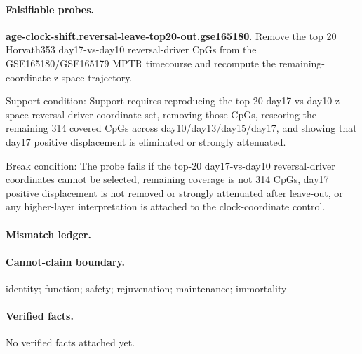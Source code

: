 \paragraph{Falsifiable probes.}
\textbf{age-clock-shift.reversal-leave-top20-out.gse165180}. Remove the top 20 Horvath353 day17-vs-day10 reversal-driver CpGs from the GSE165180/GSE165179 MPTR timecourse and recompute the remaining-coordinate z-space trajectory.

Support condition: Support requires reproducing the top-20 day17-vs-day10 z-space reversal-driver coordinate set, removing those CpGs, rescoring the remaining 314 covered CpGs across day10/day13/day15/day17, and showing that day17 positive displacement is eliminated or strongly attenuated.

Break condition: The probe fails if the top-20 day17-vs-day10 reversal-driver coordinates cannot be selected, remaining coverage is not 314 CpGs, day17 positive displacement is not removed or strongly attenuated after leave-out, or any higher-layer interpretation is attached to the clock-coordinate control.

\paragraph{Mismatch ledger.}
\paragraph{Cannot-claim boundary.} identity; function; safety; rejuvenation; maintenance; immortality

\paragraph{Verified facts.}
No verified facts attached yet.
